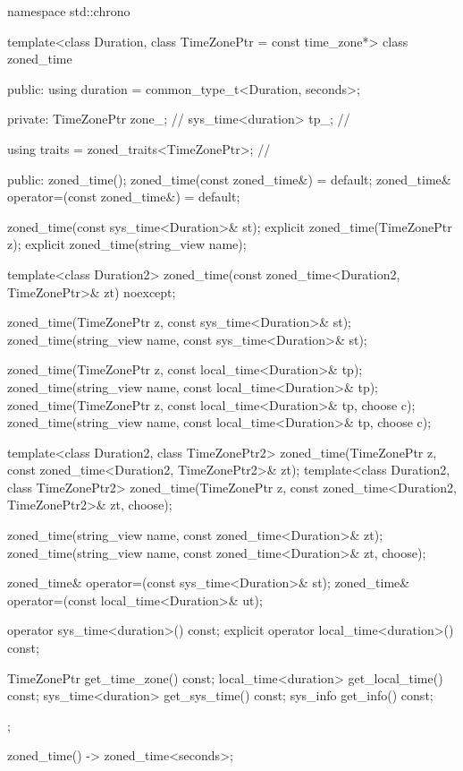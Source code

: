 \begin{codeblock}
namespace std::chrono {
  template<class Duration, class TimeZonePtr = const time_zone*>
  class zoned_time {
  public:
    using duration = common_type_t<Duration, seconds>;

  private:
    TimeZonePtr        zone_;                   // \expos
    sys_time<duration> tp_;                     // \expos

    using traits = zoned_traits<TimeZonePtr>;   // \expos

  public:
    zoned_time();
    zoned_time(const zoned_time&) = default;
    zoned_time& operator=(const zoned_time&) = default;

    zoned_time(const sys_time<Duration>& st);
    explicit zoned_time(TimeZonePtr z);
    explicit zoned_time(string_view name);

    template<class Duration2>
      zoned_time(const zoned_time<Duration2, TimeZonePtr>& zt) noexcept;

    zoned_time(TimeZonePtr z,    const sys_time<Duration>& st);
    zoned_time(string_view name, const sys_time<Duration>& st);

    zoned_time(TimeZonePtr z,    const local_time<Duration>& tp);
    zoned_time(string_view name, const local_time<Duration>& tp);
    zoned_time(TimeZonePtr z,    const local_time<Duration>& tp, choose c);
    zoned_time(string_view name, const local_time<Duration>& tp, choose c);

    template<class Duration2, class TimeZonePtr2>
      zoned_time(TimeZonePtr z, const zoned_time<Duration2, TimeZonePtr2>& zt);
    template<class Duration2, class TimeZonePtr2>
      zoned_time(TimeZonePtr z, const zoned_time<Duration2, TimeZonePtr2>& zt, choose);

    zoned_time(string_view name, const zoned_time<Duration>& zt);
    zoned_time(string_view name, const zoned_time<Duration>& zt, choose);

    zoned_time& operator=(const sys_time<Duration>& st);
    zoned_time& operator=(const local_time<Duration>& ut);

    operator sys_time<duration>() const;
    explicit operator local_time<duration>() const;

    TimeZonePtr          get_time_zone()  const;
    local_time<duration> get_local_time() const;
    sys_time<duration>   get_sys_time()   const;
    sys_info             get_info()       const;
  };

  zoned_time() -> zoned_time<seconds>;

}
\end{codeblock}
